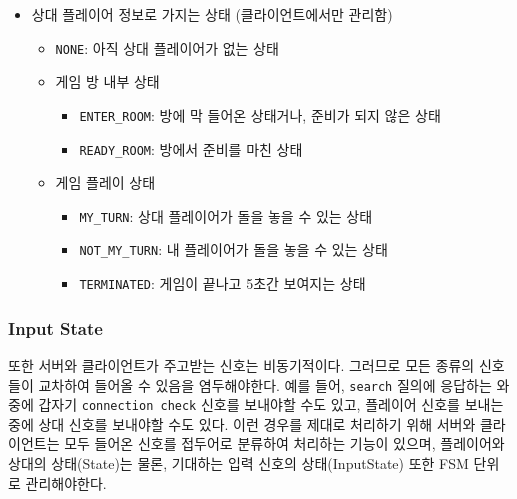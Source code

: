 \documentclass[a4paper, 10pt]{article}
\begin{document}
\begin{itemize}
\begin{itemize}
  \end{itemize}
  \item 상대 플레이어 정보로 가지는 상태 (클라이언트에서만 관리함)
  \begin{itemize}
    \item \texttt{NONE}: 아직 상대 플레이어가 없는 상태
    \item 게임 방 내부 상태
    \begin{itemize}
      \item \texttt{ENTER\_ROOM}: 방에 막 들어온 상태거나, 준비가 되지 않은 상태
      \item \texttt{READY\_ROOM}: 방에서 준비를 마친 상태
    \end{itemize}
    \item 게임 플레이 상태
    \begin{itemize}
      \item \texttt{MY\_TURN}: 상대 플레이어가 돌을 놓을 수 있는 상태
      \item \texttt{NOT\_MY\_TURN}: 내 플레이어가 돌을 놓을 수 있는 상태
      \item \texttt{TERMINATED}: 게임이 끝나고 5초간 보여지는 상태
    \end{itemize}
  \end{itemize}
\end{itemize}

\subsubsection{Input State}
또한 서버와 클라이언트가 주고받는 신호는 비동기적이다. 그러므로 모든 종류의 신호들이
교차하여 들어올 수 있음을 염두해야한다. 예를 들어, \texttt{search} 질의에
응답하는 와중에 갑자기 \texttt{connection check} 신호를 보내야할 수도 있고,
플레이어 신호를 보내는 중에 상대 신호를 보내야할 수도 있다. 이런 경우를 제대로
처리하기 위해 서버와 클라이언트는 모두 들어온 신호를 접두어로 분류하여 처리하는
기능이 있으며, 플레이어와 상대의 상태(State)는 물론, 기대하는 입력 신호의
상태(InputState) 또한 FSM 단위로 관리해야한다.
\end{document}
